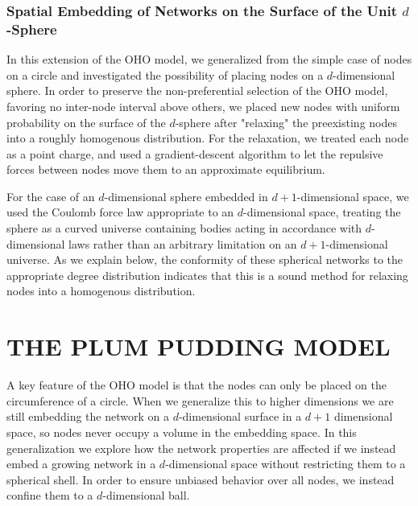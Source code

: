 \documentclass[aps,pre,reprint,superscriptaddress,amsmath,amssymb]{revtex4-1}
\begin{document}
\subsubsection{Spatial Embedding of Networks on the Surface of the Unit $d$-Sphere}
In this extension of the OHO model, we generalized from the simple case of nodes on a circle and investigated the possibility of placing nodes on a $d$-dimensional sphere.
In order to preserve the non-preferential selection of the OHO model, favoring no inter-node interval above others, we placed new nodes with uniform probability on the surface of the $d$-sphere after "relaxing" the preexisting nodes into a roughly homogenous distribution. 
For the relaxation, we treated each node as a point charge, and used a gradient-descent algorithm to let the repulsive forces between nodes move them to an approximate equilibrium.

For the case of an $d$-dimensional sphere embedded in $d+1$-dimensional space, we used the Coulomb force law appropriate to an $d$-dimensional space, treating the sphere as a curved universe containing bodies acting in accordance with $d$-dimensional laws rather than an arbitrary limitation on an $d+1$-dimensional universe.  
As we explain below, the conformity of these spherical networks to the appropriate degree distribution indicates that this is a sound method for relaxing nodes into a homogenous distribution.

\section{THE PLUM PUDDING MODEL}
A key feature of the OHO model is that the nodes can only be placed on the circumference of a circle. 
When we generalize this to higher dimensions we are still embedding the network on a $d$-dimensional surface in a $d+1$ dimensional space, so nodes never occupy a volume in the embedding space.
In this generalization we explore how the network properties are affected if we instead embed a growing network in a $d$-dimensional space without restricting them to a spherical shell.  
In order to ensure unbiased behavior over all nodes, we instead confine them to a $d$-dimensional ball. 
\end{document}
